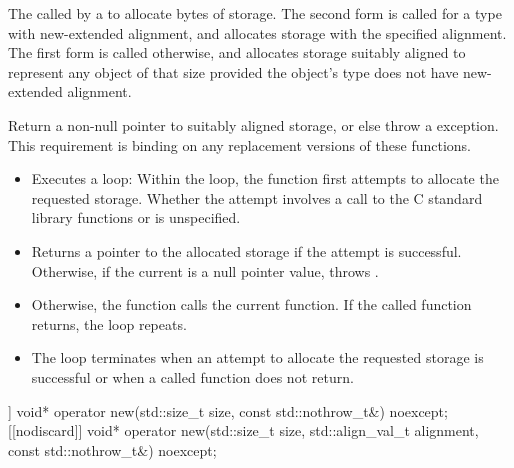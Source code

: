 \begin{itemdescr}
\pnum
\effects
The
called by a
to allocate
 bytes of storage.
The second form is called for a type with new-extended alignment,
and allocates storage
with the specified alignment.
The first form is called otherwise,
and allocates storage
suitably aligned to represent any object of that size
provided the object's type does not have new-extended alignment.

\pnum
\replaceable
{}

\pnum
\required
Return a non-null pointer to suitably aligned storage,
or else throw a
%
exception.
This requirement is binding on any replacement versions of these functions.

\pnum
{}

\begin{itemize}
\item
Executes a loop:
Within the loop, the function first attempts to allocate the requested storage.
Whether the attempt involves a call to the C standard library functions
 or 
is unspecified.
%
\item
Returns a pointer to the allocated storage if the attempt is successful.
Otherwise, if the
current  is
a null pointer value, throws
.
\item
Otherwise, the function calls the current
 function.
If the called function returns, the loop repeats.
\item
The loop terminates when an attempt to allocate the requested storage is
successful or when a called
function does not return.
\end{itemize}
\end{itemdescr}

%
\begin{itemdecl}
[[nodiscard]] void* operator new(std::size_t size, const std::nothrow_t&) noexcept;
[[nodiscard]] void* operator new(std::size_t size, std::align_val_t alignment,
                                 const std::nothrow_t&) noexcept;
\end{itemdecl}

